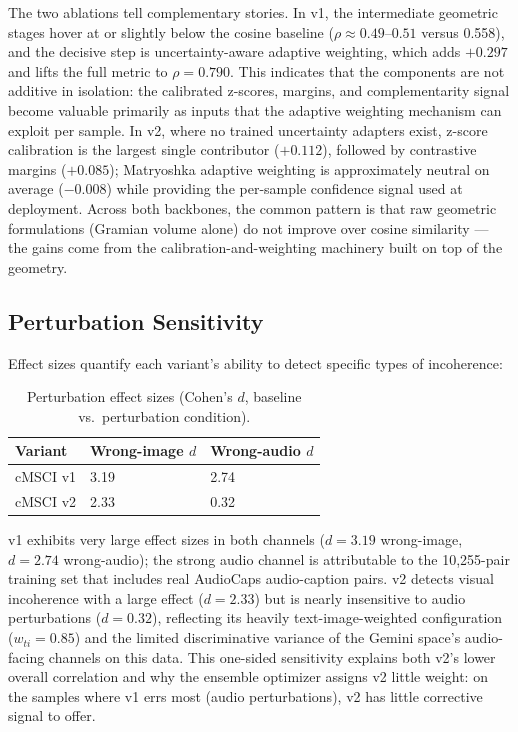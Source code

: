 The two ablations tell complementary stories. In v1, the intermediate geometric stages hover at or slightly below the cosine baseline ($\rho \approx 0.49$--$0.51$ versus 0.558), and the decisive step is uncertainty-aware adaptive weighting, which adds $+0.297$ and lifts the full metric to $\rho = 0.790$. This indicates that the components are not additive in isolation: the calibrated z-scores, margins, and complementarity signal become valuable primarily as inputs that the adaptive weighting mechanism can exploit per sample. In v2, where no trained uncertainty adapters exist, z-score calibration is the largest single contributor ($+0.112$), followed by contrastive margins ($+0.085$); Matryoshka adaptive weighting is approximately neutral on average ($-0.008$) while providing the per-sample confidence signal used at deployment. Across both backbones, the common pattern is that raw geometric formulations (Gramian volume alone) do not improve over cosine similarity — the gains come from the calibration-and-weighting machinery built on top of the geometry.

\subsection{Perturbation Sensitivity}\label{sec:perturbation-sensitivity}

Effect sizes quantify each variant's ability to detect specific types of incoherence:

\begin{table}[t]
\caption{Perturbation effect sizes (Cohen's $d$, baseline vs.\ perturbation condition).}\label{tab:perturbation}
\centering
\begin{tabular}{lll}
\toprule
Variant & Wrong-image $d$ & Wrong-audio $d$ \\
\midrule
cMSCI v1 & 3.19 & 2.74 \\
cMSCI v2 & 2.33 & 0.32 \\
\bottomrule
\end{tabular}
\end{table}

v1 exhibits very large effect sizes in both channels ($d = 3.19$ wrong-image, $d = 2.74$ wrong-audio); the strong audio channel is attributable to the 10,255-pair training set that includes real AudioCaps audio-caption pairs. v2 detects visual incoherence with a large effect ($d = 2.33$) but is nearly insensitive to audio perturbations ($d = 0.32$), reflecting its heavily text-image-weighted configuration ($w_{ti} = 0.85$) and the limited discriminative variance of the Gemini space's audio-facing channels on this data. This one-sided sensitivity explains both v2's lower overall correlation and why the ensemble optimizer assigns v2 little weight: on the samples where v1 errs most (audio perturbations), v2 has little corrective signal to offer.

